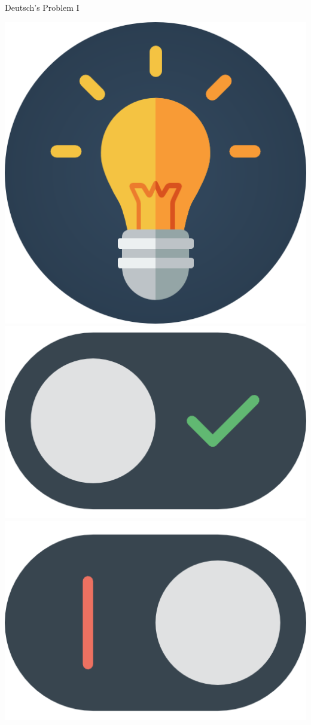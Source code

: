 \documentclass[9pt, handout, aspectratio=169]{beamer}	%
\begin{document}
\begin{frame}{Deutsch’s Problem I}
\begin{multicols}{2}
		\columnbreak
		\begin{center}
			\includegraphics[width=.20\paperwidth]{Figures/Light_Bulb} \\
			\includegraphics[width=.08\paperwidth]{Figures/Switch_ON} \\
			\includegraphics[width=.08\paperwidth]{Figures/Switch_OFF}

\end{center}
\end{multicols}
\end{frame}
\end{document}
